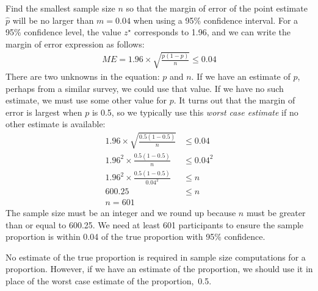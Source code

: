 \begin{example}{Find the smallest sample size $n$ so that the margin of error of the point estimate $\hat{p}$ will be no larger than $m=0.04$ when using a 95\% confidence interval.}
For a 95\% confidence level, the value $z^{\star}$ corresponds to 1.96, and we can write the margin of error expression as follows:
\begin{align*}
ME  = 1.96\times \sqrt{\frac{p(1-p)}{n}} \leq 0.04
\end{align*}
There are two unknowns in the equation: $p$ and $n$. If we have an estimate of $p$, perhaps from a similar survey, we could use that value. If we have no such estimate, we must use some other value for $p$. It turns out that the margin of error is largest when $p$ is 0.5, so we typically use this \emph{worst case estimate} if no other estimate is available:
\begin{align*}
	1.96\times \sqrt{\frac{0.5(1-0.5)}{n}} &\leq 0.04 \\
	1.96^2\times \frac{0.5(1-0.5)}{n} &\leq 0.04^2 \\
	1.96^2\times \frac{0.5(1-0.5)}{0.04^2} &\leq n \\
	600.25 &\leq n \\
	n=601
\end{align*}
The sample size must be an integer and we round up because $n$ must be greater than or equal to 600.25. We need at least 601 participants to ensure the sample proportion is within 0.04 of the true proportion with 95\% confidence.
\end{example}

No estimate of the true proportion is required in sample size computations for a proportion. However, if we have an estimate of the proportion, we should use it in place of the worst case estimate of the proportion,~0.5.


